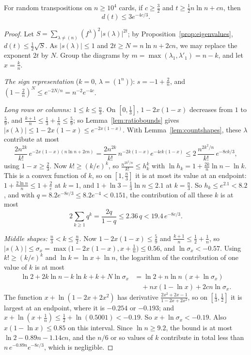 \begin{theorem}\label{thm:ds}
For random transpositions on $n\ge10^4$ cards, if $c\ge\frac32$ and $t\ge\frac12n\ln n+cn$, then
\[
d(t)\le3e^{-4c/3}.
\]
\end{theorem}

\begin{proof}
Let $S=\sum_{\lambda\ne(n)}(f^\lambda)^2|s(\lambda)|^{2t}$; by Proposition~\ref{prop:eigenvalues}, $d(t)\le\frac12\sqrt S$. As $|s(\lambda)|\le1$ and $2t\ge N=n\ln n+2cn$, we may replace the exponent $2t$ by $N$. Group the diagrams by $m=\max(\lambda_1,\lambda'_1)=n-k$, and let $x=\frac kn$.

\emph{The sign representation} ($k=0$, $\lambda=(1^n)$): $s=-1+\frac2n$, and $(1-\frac2n)^N\le e^{-2N/n}=n^{-2}e^{-4c}$.

\emph{Long rows or columns: $1\le k\le\frac n3$.} On $[0,\frac13]$, $1-2x(1-x)$ decreases from $1$ to $\frac59$, and $\frac{k+1}n\le\frac13+\frac1n\le\frac59$; so Lemma~\ref{lem:ratiobounds} gives $|s(\lambda)|\le1-2x(1-x)\le e^{-2x(1-x)}$. With Lemma~\ref{lem:countshapes}, these $\lambda$ contribute at most
\[
\frac{2n^{2k}}{k!}\,e^{-2x(1-x)(n\ln n+2cn)}=\frac{2n^{2k}}{k!}\,n^{-2k(1-x)}e^{-4ck(1-x)}\le2\,\frac{n^{2k^2/n}}{k!}\,e^{-8ck/3},
\]
using $1-x\ge\frac23$. Now $k!\ge(k/e)^k$, so $\frac{n^{2k^2/n}}{k!}\le h_k^k$ with $\ln h_k=1+\frac{2k}n\ln n-\ln k$. This is a convex function of $k$, so on $[1,\frac n3]$ it is at most its value at an endpoint: $1+\frac{2\ln n}n\le1+\frac2e$ at $k=1$, and
$1+\ln3-\frac13\ln n\le2.1$ at $k=\frac n3$. So $h_k\le e^{2.1}<8.2$, and with $q=8.2e^{-8c/3}\le8.2e^{-4}<0.151$, the contribution of all these $k$ is at most
\[
2\sum_{k\ge1}q^k=\frac{2q}{1-q}\le2.36\,q<19.4\,e^{-8c/3}.
\]

\emph{Middle shapes: $\frac n3<k\le\frac n2$.} Now $1-2x(1-x)\le\frac59$ and $\frac{k+1}n\le\frac12+\frac1n$, so $|s(\lambda)|\le\sigma_x=\max\bigl(1-2x(1-x),x+\frac1n\bigr)\le0.56$, and $\ln\sigma_x<-0.57$. Using $k!\ge(k/e)^k$ and $\ln k=\ln x+\ln n$, the logarithm of the
contribution of one value of $k$ is at most
\[
\begin{aligned}\ln2+2k\ln n-k\ln k+k+N\ln\sigma_x&=\ln2+n\ln n\,(x+\ln\sigma_x)\\&\quad+nx(1-\ln x)+2cn\ln\sigma_x.\end{aligned}
\]
The function $x+\ln(1-2x+2x^2)$ has derivative $\frac{2x^2+2x-1}{1-2x+2x^2}$, so on $[\frac13,\frac12]$ it is largest at an endpoint, where it is $-0.254$ or $-0.193$; and $x+\ln(x+\frac1n)\le\frac12+\ln(0.5001)<-0.19$. So $x+\ln\sigma_x<-0.19$. Also
$x(1-\ln x)\le0.85$ on this interval. Since $\ln n\ge9.2$, the bound is at most $\ln2-0.89n-1.14cn$, and the $n/6$ or so values of $k$ contribute in total less than $n\,e^{-0.89n}e^{-8c/3}$, which is negligible.


\end{proof}
